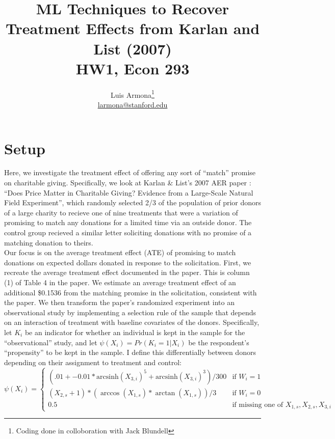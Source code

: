 \documentclass{article}
\begin{document}
\newcommand{\ihs}{\mathrm{arcsinh}}
\title{ML Techniques to Recover Treatment Effects from Karlan and List (2007) \\ HW1, Econ 293}
\author{Luis Armona\footnote{Coding done in colloboration with Jack Blundell} \\ \href{mailto:larmona@stanford.edu}{larmona@stanford.edu} }
\maketitle

\section{Setup}
Here, we investigate the treatment effect of offering any sort of ``match'' promise on charitable giving. Specifically, we look at Karlan \& List's 2007 AER paper : ``Does Price Matter in Charitable Giving? Evidence from a Large-Scale Natural Field Experiment'', which randomly selected 2/3 of the population of prior donors of a large charity to recieve one of nine treatments that were a variation of promising to match any donations for a limited time via an outside donor. The control group recieved a similar letter soliciting donations with no promise of a matching donation to theirs. \\ \indent
Our focus is on the average treatment effect (ATE) of promising to match donations on expected dollars donated in response to the solicitation. First, we recreate the average treatment effect documented in the paper. This is column (1) of Table 4 in the paper. We estimate an average treatment effect of an additional
\$0.1536 from the matching promise in the solicitation, consistent with the paper. We then transform the paper's randomized experiment into an observational study by implementing a selection rule of the sample that depends on an interaction of treatment with baseline covariates of the donors. Specifically, let $K_i$ be an indicator for whether an individual is kept in the sample for the ``observational'' study, and let $\psi(X_i) = Pr(K_i=1|X_i)$ be the respondent's ``propensity'' to be kept in the sample. I define this differentially between donors depending on their assignment to treatment and control:
\[
  \psi(X_i)= \begin{cases}
  	  (.01 + -0.01*\ihs(X_{3,i})^5 + \ihs(X_{3,i})^3)/300 & \text{if $W_i=1$} \\
	  (X_{2,s}+1)*(\arccos(X_{1,s})*\arctan(X_{1,s}) )/3 & \text{if $W_i=0$} \\ 
     0.5 & \text{if missing one of $X_{1,s},X_{2,s},X_{3,i}$}
      \end{cases} 
\]
\end{document}
